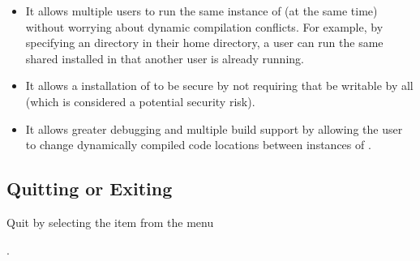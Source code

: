 \begin{itemize}
\item It allows multiple users to run the same instance of \sr{} (at
the same time) without worrying about dynamic compilation conflicts.
For example, by specifying an 
directory in their home directory, a user can run the same shared
\sr{} installed in  that another user
is already running.

\item It allows a  installation of \sr{}
to be secure by not requiring that
 be writable by
all (which is considered a potential security risk).

\item It allows greater debugging and multiple build support by
allowing the user to change dynamically compiled code locations
between instances of \sr{}.

\end{itemize}


\subsection{Quitting or Exiting \sr{}}
\label{sec:stopping}

Quit \sr{} by selecting the  item from the  menu

.


